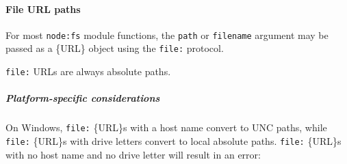 \paragraph{File URL paths}\label{file-url-paths}

For most \texttt{node:fs} module functions, the \texttt{path} or
\texttt{filename} argument may be passed as a \{URL\} object using the
\texttt{file:} protocol.

\begin{Shaded}
\begin{Highlighting}[]
 \OperatorTok{;}

\NormalTok{(} \NormalTok{(}\NormalTok{))}\OperatorTok{;}
\end{Highlighting}
\end{Shaded}

\texttt{file:} URLs are always absolute paths.

\subparagraph{Platform-specific
considerations}\label{platform-specific-considerations}

On Windows, \texttt{file:} \{URL\}s with a host name convert to UNC
paths, while \texttt{file:} \{URL\}s with drive letters convert to local
absolute paths. \texttt{file:} \{URL\}s with no host name and no drive
letter will result in an error:

